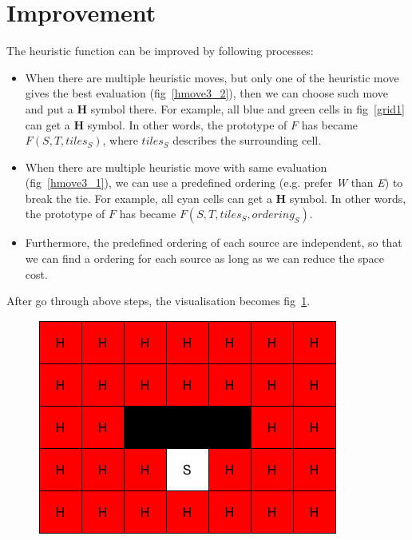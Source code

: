 \section{Improvement}
The heuristic function can be improved by following processes:
\begin{itemize}
  \item When there are multiple heuristic moves, but only one of the heuristic
    move gives the best evaluation (fig~\ref{hmove3_2}), then we can choose such move and put a \textbf{H}
    symbol there. For example, all blue and green cells in fig~\ref{grid1} can get a \textbf{H} symbol.
    In other words, the prototype of $F$ has became $F(S, T, tiles_S)$, where
    $tiles_S$ describes the surrounding cell.

  \item When there are multiple heuristic move with same evaluation (fig~\ref{hmove3_1}), we
    can use a predefined ordering (e.g. prefer \textit{W} than \textit{E}) to break the tie. For example, all cyan cells can get
    a \textbf{H} symbol. In other words, the prototype of $F$ has became $F(S, T, tiles_S, ordering_S)$.

  \item Furthermore, the predefined ordering of each source are independent, so that we can
    find a ordering for each source as long as we can reduce the space cost.

\end{itemize}

After go through above steps, the visualisation becomes fig~\ref{grid2}.

\begin{figure}[t]
  \centering
  \includegraphics[width=.5\columnwidth]{./grid2.png}
  \caption{}
  \label{grid2}
\end{figure}
